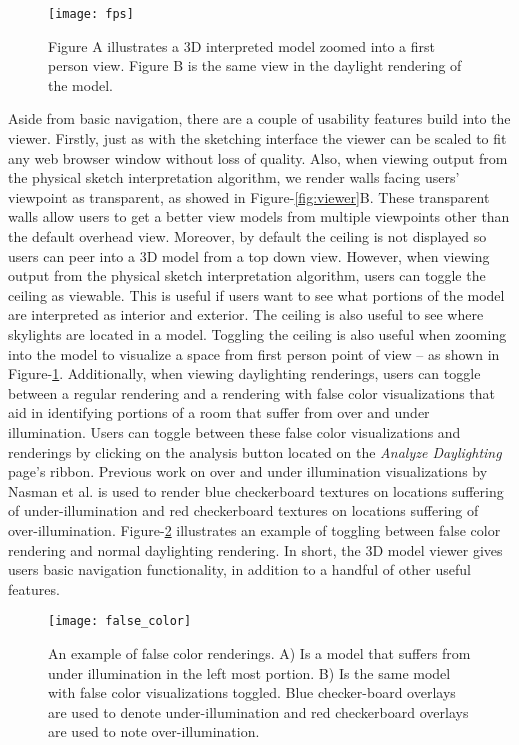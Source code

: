 	\begin{figure}[h]
	\centering
	\texttt{[image: fps]}
	\caption{Figure A illustrates a 3D interpreted model zoomed into a first person view. Figure B is the same view in the daylight rendering of the model.}
	\label{fig:fps}
	\end{figure}

	Aside from basic navigation, there are a couple of usability features build into the viewer.
	Firstly, just as with the sketching interface the viewer can be scaled to fit any web browser window without loss of quality. 
	Also, when viewing output from the physical sketch interpretation algorithm, we render walls facing users' viewpoint as transparent, as showed in Figure-\ref{fig:viewer}B. 
	These transparent walls  allow users to get a better view models from multiple viewpoints other than the default overhead view.
	Moreover, by default the ceiling is not displayed so users can peer into a 3D model from a top down view.
	However, when viewing output from the physical sketch interpretation algorithm, users can toggle the ceiling as viewable. 
	This is useful if users want to see what portions of the model are interpreted as interior and exterior. 
	The ceiling is also useful to see where skylights are located in a model.
	Toggling the ceiling is also useful when zooming into the model to visualize a space from first person point of view -- as shown in Figure-\ref{fig:fps}.
	Additionally, when viewing daylighting renderings, users can toggle between a regular rendering and a rendering with false color visualizations that aid in identifying portions of a room that suffer from over and under illumination.
	Users can toggle between these false color visualizations and renderings by clicking on the analysis button located on the \textit{Analyze Daylighting} page's ribbon.
	Previous work on over and under illumination visualizations by Nasman et al. is used to render blue checkerboard textures on locations suffering of under-illumination and red checkerboard textures on locations suffering of over-illumination\cite{nasman2013physical}.
	Figure-\ref{fig:false_color} illustrates an example of toggling between false color rendering and normal daylighting rendering.
	In short, the 3D model viewer gives users basic navigation functionality, in addition to a handful of other useful features.

	\begin{figure}[h]
	\centering
	\texttt{[image: false\_color]}
	\caption{An example of false color renderings. A) Is a model that suffers from under illumination in the left most portion. B) Is the same model with false color visualizations toggled. Blue checker-board overlays are used to denote under-illumination and red checkerboard overlays are used to note over-illumination.}
	\label{fig:false_color}
	\end{figure}


